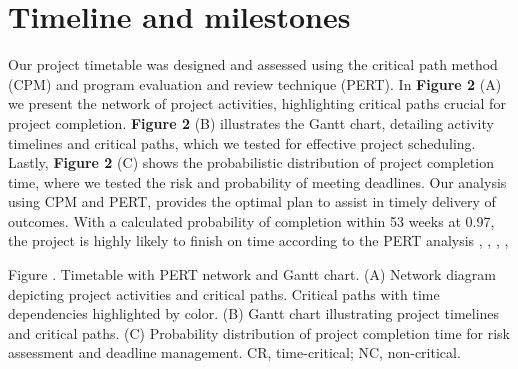 
\section{Timeline and milestones}\label{timetable-analysis}

Our project timetable was designed and assessed using the critical path
method (CPM) and program evaluation and review technique (PERT). In
\textbf{Figure 2} (A) we present the network of project activities,
highlighting critical paths crucial for project completion.
\textbf{Figure 2} (B) illustrates the Gantt chart, detailing activity
timelines and critical paths, which we tested for effective project
scheduling. Lastly, \textbf{Figure 2} (C) shows the probabilistic
distribution of project completion time, where we tested the risk and
probability of meeting deadlines. Our analysis using CPM and PERT,
provides the optimal plan to assist in timely delivery of outcomes. With
a calculated probability of completion within 53 weeks at 0.97, the
project is highly likely to finish on time according to the PERT
analysis \citep{ref25}, \citep{ref26}, \citep{ref27}, \citep{ref28}, \citep{ref29}

Figure . Timetable with PERT network and Gantt chart. (A) Network
diagram depicting project activities and critical paths. Critical paths
with time dependencies highlighted by color. (B) Gantt chart
illustrating project timelines and critical paths. (C) Probability
distribution of project completion time for risk assessment and deadline
management. CR, time-critical; NC, non-critical.